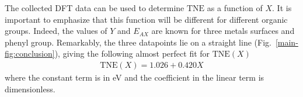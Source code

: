 \documentclass[aps,prl,reprint,amsmath,amssymb,floatfix,notitlepage]{revtex4-1}
\begin{document}
The collected DFT data can be used to determine $\text{TNE}$ as a function of $X$. It is important to emphasize that this function will be different for different organic groups. Indeed, the values of $Y$ and $E_{AX}$ are known for three metals surfaces and phenyl group. Remarkably, the three datapoints lie on a straight line (Fig.~\ref{main-fig:conclusion}), giving the following almost perfect fit for $\text{TNE}(X)$
%
\begin{equation} \label{eq:TNEfit}
\begin{split}
\text{TNE}(X) = 1.026 + 0.420 X
\end{split}
\end{equation}
%
where the constant term is in \si{\electronvolt} and the coefficient in the linear term is dimensionless. 


\end{document}
